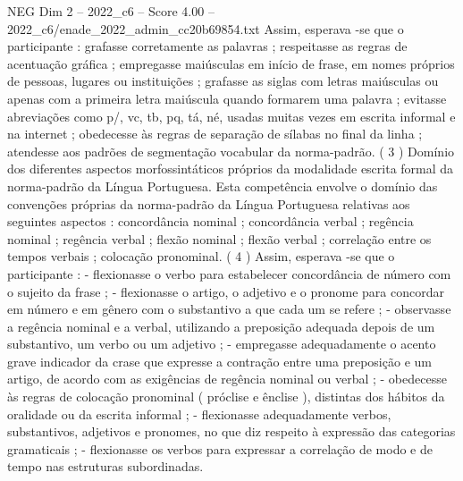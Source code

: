 \begin{textsample}{NEG Dim 2 – 2022\_c6 – Score 4.00 – 2022\_c6/enade\_2022\_admin\_cc20b69854.txt}
Assim, esperava -se que o participante : grafasse corretamente as palavras ; respeitasse as regras de acentuação gráfica ; empregasse maiúsculas em início de frase, em nomes próprios de pessoas, lugares ou instituições ; grafasse as siglas com letras maiúsculas ou apenas com a primeira letra maiúscula quando formarem uma palavra ; evitasse abreviações como p/, vc, tb, pq, tá, né, usadas muitas vezes em escrita informal e na internet ; obedecesse às regras de separação de sílabas no final da linha ; atendesse aos padrões de segmentação vocabular da norma-padrão. ( 3 ) Domínio dos diferentes aspectos morfossintáticos próprios da modalidade escrita formal da norma-padrão da Língua Portuguesa.
Esta competência envolve o domínio das convenções próprias da norma-padrão da Língua Portuguesa relativas aos seguintes aspectos : concordância nominal ; concordância verbal ; regência nominal ; regência verbal ; flexão nominal ; flexão verbal ; correlação entre os tempos verbais ; colocação pronominal. ( 4 ) Assim, esperava -se que o participante : - flexionasse o verbo para estabelecer concordância de número com o sujeito da frase ; - flexionasse o artigo, o adjetivo e o pronome para concordar em número e em gênero com o substantivo a que cada um se refere ; - observasse a regência nominal e a verbal, utilizando a preposição adequada depois de um substantivo, um verbo ou um adjetivo ; - empregasse adequadamente o acento grave indicador da crase que expresse a contração entre uma preposição e um artigo, de acordo com as exigências de regência nominal ou verbal ; - obedecesse às regras de colocação pronominal ( próclise e ênclise ), distintas dos hábitos da oralidade ou da escrita informal ; - flexionasse adequadamente verbos, substantivos, adjetivos e pronomes, no que diz respeito à expressão das categorias gramaticais ; - flexionasse os verbos para expressar a correlação de modo e de tempo nas estruturas subordinadas.

\end{textsample}
